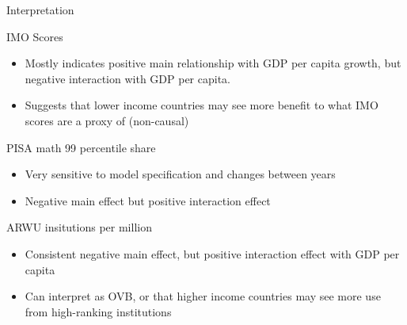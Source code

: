 \documentclass[10pt]{beamer}
\begin{document}
\begin{frame}{Interpretation}
    \begin{block}{IMO Scores}
        \begin{itemize}
            \item Mostly indicates positive main relationship with GDP per capita growth, but negative interaction with GDP per capita.
            \item Suggests that lower income countries may see more benefit to what IMO scores are a proxy of (non-causal)
        \end{itemize}
    \end{block}

    \begin{block}{PISA math 99 percentile share}
        \begin{itemize}
            \item Very sensitive to model specification and changes between years
            \item Negative main effect but positive interaction effect
        \end{itemize}
    \end{block}

    \begin{block}{ARWU insitutions per million}
        \begin{itemize}
            \item Consistent negative main effect, but positive interaction effect with GDP per capita
            \item Can interpret as OVB, or that higher income countries may see more use from high-ranking institutions
        \end{itemize}
    \end{block}
    
\end{frame}
\end{document}
